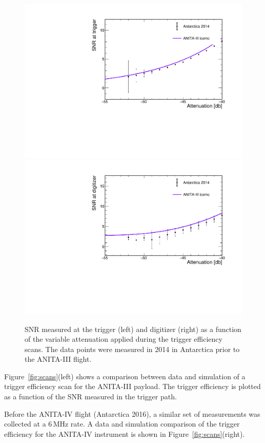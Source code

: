 \begin{figure}[!h]\centering
  \includegraphics[width=.45\linewidth]{./Figs/EfficiencyScanNoDelaysA3_snrTriggerVSattenuation.pdf} 
  \includegraphics[width=.45\linewidth]{./Figs/EfficiencyScanNoDelaysA3_snrDigitizerVSattenuation.pdf}
  \caption{SNR measured at the trigger (left) and digitizer (right) as
  a function of the variable attenuation applied during the trigger
  efficiency scans. The data points were measured in 2014 in Antarctica prior to the
  ANITA-III flight.
}
  \label{fig:scan_snr}
\end{figure}

Figure~\ref{fig:scans}(left) shows a comparison between data and simulation of a trigger efficiency scan for the ANITA-III payload.
The trigger efficiency is plotted as a function of the SNR
measured in the trigger path.

Before the ANITA-IV flight (Antarctica 2016), a similar set of measurements was collected at a 6\,MHz rate. 
A data and simulation comparison of the trigger efficiency for the ANITA-IV instrument is shown in Figure~\ref{fig:scans}(right).

